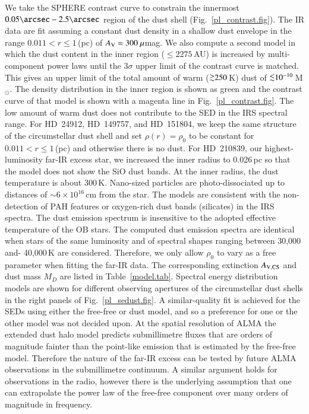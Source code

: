 \documentclass[tradiabstract]{aa} %
\newcommand{\Msun} {M$_{\odot}$}
\newcommand{\simgreat} {\mathbin{\lower 3pt\hbox{$\rlap{\raise
        5pt\hbox{$\char'076$}}\mathchar"7218$}}}
\newcommand{\simless}{\mathbin{\lower 3pt\hbox {$\rlap{\raise
        5pt\hbox{$\char'074$}}\mathchar"7218$}}}
\begin{document}
We take the SPHERE contrast curve to constrain the innermost
$0.05\arcsec - 2.5\arcsec$ region of the dust shell
(Fig.~\ref{pl_contrast.fig}).  The IR data are fit assuming a constant
dust density in a shallow dust envelope in the range $0.011 < r \leq
1$\,(pc) of $A_{\rm V} = 300 \ \mu$mag.  We also compute a second
model in which the dust content in the inner region ($\leq 2275$\,AU)
is increased by multi-component power laws until the $3\sigma$ upper
limit of the contrast curve is matched. This gives an upper limit of
the total amount of warm ($\simgreat 250$\,K) dust of $\simless
10^{-10}$\,\Msun \/.  The density distribution in the inner region is
shown as green and the contrast curve of that model is shown with a
magenta line in Fig.~\ref{pl_contrast.fig}. The low amount of warm
dust does not contribute to the SED in the IRS spectral range. { For HD~24912, HD~149757, and HD~151804, we  keep} the same structure of
the circumstellar dust shell and set $\rho(r) =\rho_0$ to be constant
for $0.011 < r \leq 1$\,(pc) and otherwise there is no dust. { For
  HD~210839, our highest-luminosity far-IR excess star, we increased
  the inner radius to 0.026\,pc so that the model does not show the
  SiO dust bands. At the inner radius, the dust temperature is about
  300\,K. Nano-sized particles are photo-dissociated up to distances
  of $\sim 6 \times 10^{16}$\,cm from the star. The models are
  consistent with the non-detection of PAH features or oxygen-rich
  dust bands (silicates) in the IRS spectra. The dust emission
  spectrum is insensitive to the adopted effective temperature of the
  OB stars.  The computed dust emission spectra are identical when
  stars of the same luminosity and of spectral shapes ranging between 30,000
  and- 40,000\,K are considered.  Therefore,} we only allow  $\rho_0$ to vary as a free parameter when fitting the far-IR data. The corresponding extinction
$A_{\rm {V, CS}}$ and dust mass $M_D$ are listed in
Table~\ref{model.tab}. Spectral energy distribution models are shown for different observing
apertures of the circumstellar dust shells in the right panels of
Fig.~\ref{pl_sedust.fig}.{ A similar-quality fit is achieved for the SEDs using  either the free-free or dust model, and so a preference for one or the other model was not decided upon.  At the spatial resolution of ALMA
  the extended dust halo model predicts submillimetre fluxes that are
  orders of magnitude fainter than the point-like emission that is
  estimated by the free-free model.  Therefore the nature of the
  far-IR excess can be tested by future ALMA observations in the
  submillimetre continuum. A similar argument holds for observations in
  the radio, however there is the underlying assumption that one can
  extrapolate the power law of the free-free component over many
  orders of magnitude in frequency.}
\end{document}
